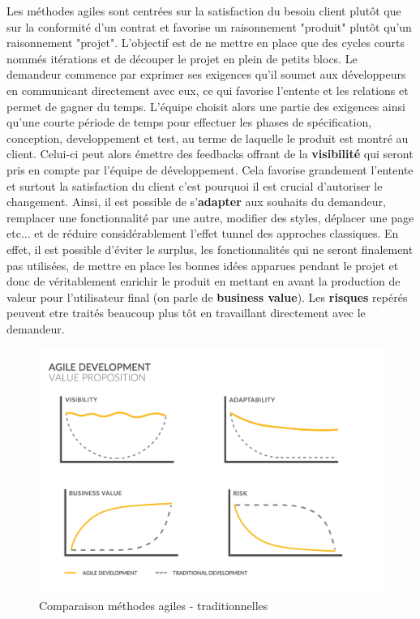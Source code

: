 	Les méthodes agiles sont centrées sur la satisfaction du besoin client plutôt que sur la conformité d'un contrat et favorise un raisonnement "produit" plutôt qu'un raisonnement "projet". L'objectif est de ne mettre en place que des cycles courts nommés itérations et de découper le projet en plein de petits blocs. Le demandeur commence par exprimer ses exigences qu'il soumet aux développeurs en communicant directement avec eux, ce qui favorise l'entente et les relations et permet de gagner du temps. L'équipe choisit alors une partie des exigences ainsi qu'une courte période de temps pour effectuer les phases de spécification, conception, developpement et test, au terme de laquelle le produit est montré au client. Celui-ci peut alors émettre des feedbacks offrant de la \textbf{visibilité} qui seront pris en compte par l'équipe de développement. Cela favorise grandement l'entente et surtout la satisfaction du client c'est pourquoi il est crucial d'autoriser le changement. Ainsi, il est possible de s'\textbf{adapter} aux souhaits du demandeur, remplacer une fonctionnalité par une autre, modifier des styles, déplacer une page etc... et de réduire considérablement l'effet tunnel des approches classiques. En effet, il est possible d'éviter le surplus, les fonctionnalités qui ne seront finalement pas utilisées, de mettre en place les bonnes idées apparues pendant le projet et donc de véritablement enrichir le produit en mettant en avant la production de valeur pour l'utilisateur final (on parle de \textbf{business value}). Les \textbf{risques} repérés peuvent etre traités beaucoup plus tôt en travaillant directement avec le demandeur. 
	
\begin{figure}[h!]
	\includegraphics[scale=0.25]{images/travailBP1818/agile.png}
	\centering
	\caption{Comparaison méthodes agiles - traditionnelles}
	\label{agile}
\end{figure}

